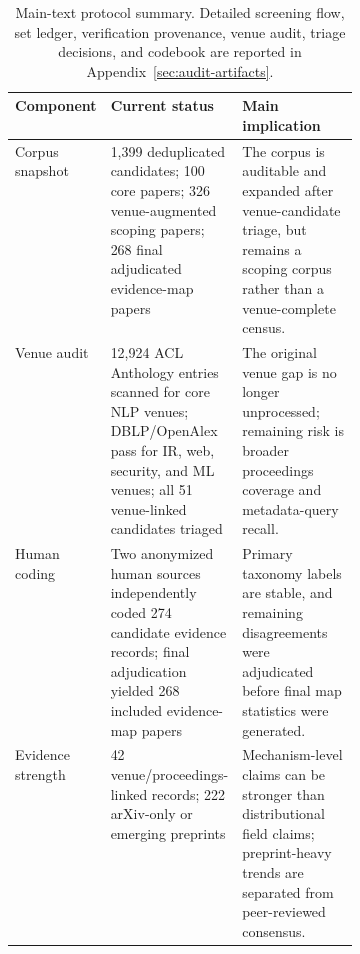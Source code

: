 \begin{table}[t]
\centering
\small
\begin{tabularx}{\linewidth}{p{0.16\linewidth}p{0.24\linewidth}X}
\toprule
\textbf{Component} & \textbf{Current status} & \textbf{Main implication} \\
\midrule
Corpus snapshot & 1,399 deduplicated candidates; 100 core papers; 326 venue-augmented scoping papers; 268 final adjudicated evidence-map papers & The corpus is auditable and expanded after venue-candidate triage, but remains a scoping corpus rather than a venue-complete census. \\
Venue audit & 12,924 ACL Anthology entries scanned for core NLP venues; DBLP/OpenAlex pass for IR, web, security, and ML venues; all 51 venue-linked candidates triaged & The original venue gap is no longer unprocessed; remaining risk is broader proceedings coverage and metadata-query recall. \\
Human coding & Two anonymized human sources independently coded 274 candidate evidence records; final adjudication yielded 268 included evidence-map papers & Primary taxonomy labels are stable, and remaining disagreements were adjudicated before final map statistics were generated. \\
Evidence strength & 42 venue/proceedings-linked records; 222 arXiv-only or emerging preprints & Mechanism-level claims can be stronger than distributional field claims; preprint-heavy trends are separated from peer-reviewed consensus. \\
\bottomrule
\end{tabularx}
\caption{Main-text protocol summary. Detailed screening flow, set ledger, verification provenance, venue audit, triage decisions, and codebook are reported in Appendix~\ref{sec:audit-artifacts}.}
\label{tab:protocol-summary-main}
\end{table}
